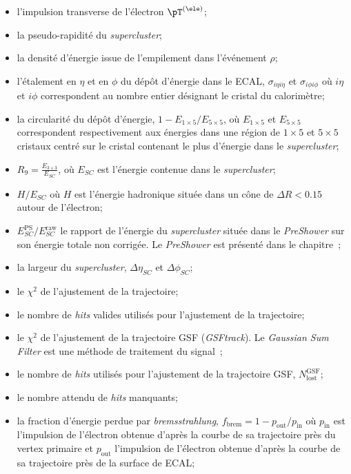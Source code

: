 \begin{itemize}
\item l'impulsion transverse de l'électron $\pT^{(\ele)}$;
\item la pseudo-rapidité du \emph{supercluster};
\item la densité d'énergie issue de l'empilement dans l'événement $\rho$;

\item l'étalement en $\eta$ et en $\phi$ du dépôt d'énergie dans le ECAL, $\sigma_{i\eta i\eta}$ et $\sigma_{i\phi i\phi}$ où $i\eta$ et $i\phi$ correspondent au nombre entier désignant le cristal du calorimètre;
\item la circularité du dépôt d'énergie, $1- E_{1\times5}/E_{5\times5}$, où $ E_{1\times5}$ et $E_{5\times5}$ correspondent respectivement aux énergies dans une région de $1\times5$ et $5\times5$ cristaux centré sur le cristal contenant le plus d'énergie dans le \emph{supercluster};
\item $R_9 = \frac{E_{3\times3}}{E_{SC}}$, où $E_{SC}$ est l'énergie contenue dans le \emph{supercluster};
\item $H/E_{SC}$ où $H$ est l'énergie hadronique située dans un cône de $\Delta R < \num{0.15}$ autour de l'électron;
\item $E_{SC}^\text{PS}/E_{SC}^\text{raw}$ le rapport de l'énergie du \emph{supercluster} située dans le \emph{PreShower} sur son énergie totale non corrigée.
Le \emph{PreShower} est présenté dans le chapitre~;
\item la largeur du \emph{supercluster}, $\Delta \eta_{SC}$ et $\Delta \phi_{SC}$;

\item le $\chi^2$ de l'ajustement de la trajectoire;
\item le nombre de \emph{hits} valides utilisés pour l'ajustement de la trajectoire;
\item le $\chi^2$ de l'ajustement de la trajectoire GSF (\emph{GSFtrack}). Le \emph{Gaussian Sum Filter} est une méthode de traitement du signal~\cite{GSF};
\item le nombre de \emph{hits} utilisés pour l'ajustement de la trajectoire GSF, $N_\text{lost}^\text{GSF}$;
\item le nombre attendu de \emph{hits} manquants;
\item la fraction d'énergie perdue par \emph{bremsstrahlung}, $f_\text{brem} = 1-p_\text{out}/p_\text{in}$ où
$p_\text{in}$ est l'impulsion de l'électron obtenue d'après la courbe de sa trajectoire près du vertex primaire et
$p_\text{out}$ l'impulsion de l'électron obtenue d'après la courbe de sa trajectoire près de la surface de ECAL;


\end{itemize}
